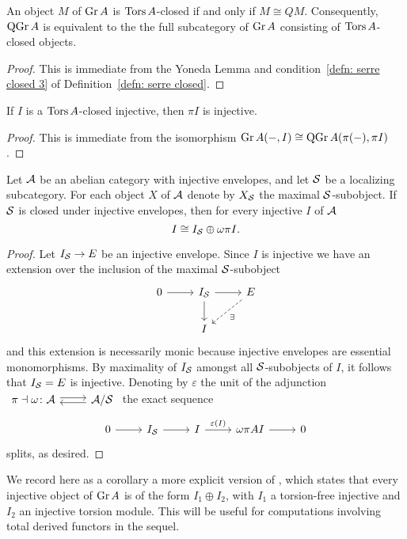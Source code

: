 \begin{lemma}
  An object \(M\) of \(\operatorname{Gr}A\) is \(\operatorname{Tors}A\)-closed if and only if \(M \cong QM\).
  Consequently, \(\operatorname{QGr}A\) is equivalent to the the full subcategory of \(\operatorname{Gr}A\) consisting of \(\operatorname{Tors}A\)-closed objects.
\end{lemma}
\begin{proof}
  This is immediate from the Yoneda Lemma and condition~\ref{defn: serre closed 3} of Definition~\ref{defn: serre closed}.
\end{proof}

\begin{lemma}
  If \(I\) is a \(\operatorname{Tors}A\)-closed injective, then \(\pi{I}\) is injective.
\end{lemma}

\begin{proof}
  This is immediate from the isomorphism \(\operatorname{Gr}A(-, I) \cong \operatorname{QGr}A(\pi(-), \pi{I})\).
\end{proof}

\begin{proposition}\label{prop: decomposition of injectives}
  Let \(\mathcal{A}\) be an abelian category with injective envelopes, and let \(\mathcal{S}\) be a localizing subcategory.
  For each object \(X\) of \(\mathcal{A}\) denote by \(X_{\mathcal{S}}\) the maximal \(\mathcal{S}\)-subobject.
  If \(\mathcal{S}\) is closed under injective envelopes, then for every injective \(I\) of \(\mathcal{A}\)
  \[I \cong I_{\mathcal{S}} \oplus \omega\pi{I}.\]
\end{proposition}

\begin{proof}
  Let \(I_{\mathcal{S}} \to E\) be an injective envelope.
  Since \(I\) is injective we have an extension over the inclusion of the maximal \(\mathcal{S}\)-subobject
  \[\begin{tikzcd}
  0 \arrow{r} & I_\Serre \arrow{r}\arrow{d} & E \arrow[dashed]{ld}{\exists}\\
  & I
  \end{tikzcd}\]
  and this extension is necessarily monic because injective envelopes are essential monomorphisms.
  By maximality of \(I_{\mathcal{S}}\) amongst all \(\mathcal{S}\)-subobjects of \(I\), it follows that \(I_{\mathcal{S}} = E\) is injective.
  Denoting by \(\varepsilon\) the unit of the adjunction
  \(\begin{tikzcd}
  \pi \dashv \omega \colon \A \arrow[shift left=.5ex]{r} & \A/\Serre \arrow[shift left=.5ex]{l}
  \end{tikzcd}\)
  the exact sequence
  \[\begin{tikzcd}
  0 \arrow{r} & I_\Serre \arrow{r} & I \arrow{r}{\varepsilon(I)} & \omega\pi{A} I \arrow{r} & 0
  \end{tikzcd}\]  splits, as desired.
\end{proof}
We record here as a corollary a more explicit version of \parencite[Prop 7.1 (5)]{AZ94}, which states that every injective object of \(\operatorname{Gr}A\) is of the form \(I_1 \oplus I_2\), with \(I_1\) a torsion-free injective and \(I_2\) an injective torsion module.
This will be useful for computations involving total derived functors in the sequel.

